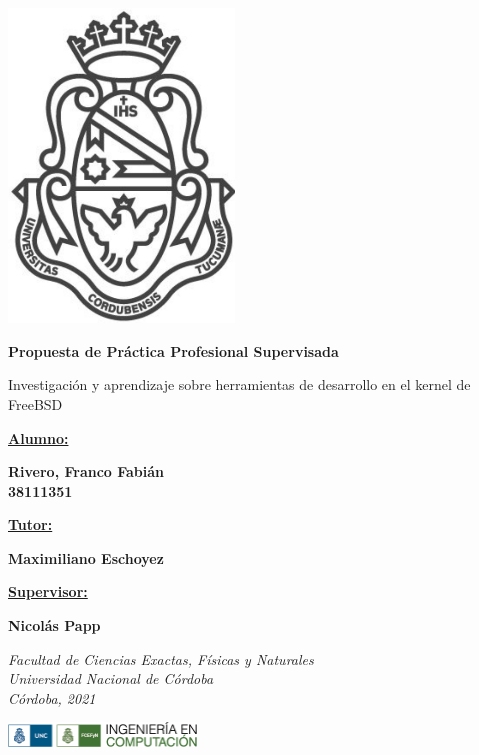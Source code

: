 \documentclass[a4paper, 11pt]{article}
\begin{document}
\begin{titlepage}
   \begin{center}
   \includegraphics[width=6cm]{recursos/logo_UNC}
   
   \Huge
   \textbf{Propuesta de Práctica Profesional Supervisada}
   
   \vspace{0.5cm}
   \LARGE
   Investigación y aprendizaje sobre herramientas de desarrollo en el kernel de FreeBSD

   \vspace{0.5cm}
   \large
   \underline{\textbf{Alumno:}}
   
   \textbf{Rivero, Franco Fabián \\38111351}
   \vspace{0.2cm}
   
   \underline{\textbf{Tutor:}}
   
   \textbf{Maximiliano Eschoyez}
   
    \vspace{0.2cm}
   
   \underline{\textbf{Supervisor:}}
   
   \textbf{Nicolás Papp}
   \vspace{0.5cm}
   
   \textit{Facultad de Ciencias Exactas, Físicas y Naturales}\\
   \textit{Universidad Nacional de Córdoba}\\
   \textit{Córdoba, 2021}
   
   \vspace{1cm}
   
   \includegraphics[width=5cm]{recursos/logo}
\end{center}  
\end{titlepage}
\end{document}
